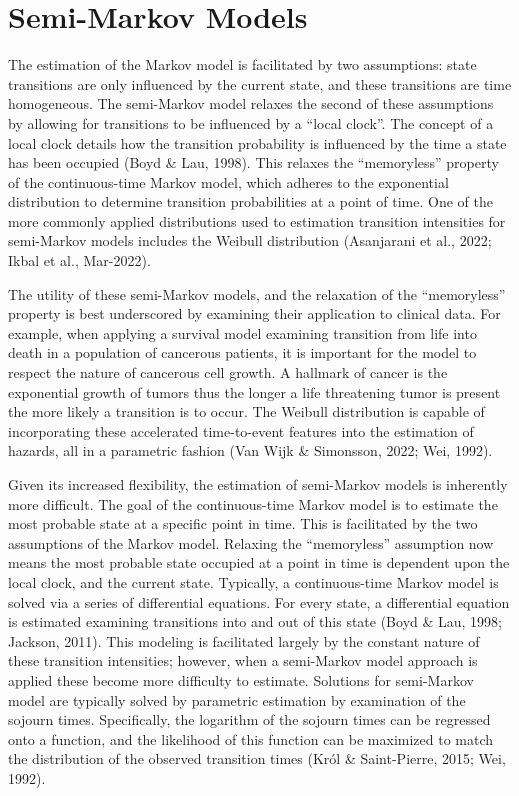 \documentclass[12pt]{./styles/outhesis}
\begin{document}
\section{Semi-Markov Models}
The estimation of the Markov model is facilitated by two assumptions:
state transitions are only influenced by the current state, and these
transitions are time homogeneous. The semi-Markov model relaxes the
second of these assumptions by allowing for transitions to be influenced
by a ``local clock''. The concept of a local clock details how the
transition probability is influenced by the time a state has been
occupied (Boyd \& Lau, 1998). This relaxes the ``memoryless'' property
of the continuous-time Markov model, which adheres to the exponential
distribution to determine transition probabilities at a point of time.
One of the more commonly applied distributions used to estimation
transition intensities for semi-Markov models includes the Weibull
distribution (Asanjarani et al., 2022; Ikbal et al., Mar-2022).

The utility of these semi-Markov models, and the relaxation of the
``memoryless'' property is best underscored by examining their
application to clinical data. For example, when applying a survival
model examining transition from life into death in a population of
cancerous patients, it is important for the model to respect the nature
of cancerous cell growth. A hallmark of cancer is the exponential growth
of tumors thus the longer a life threatening tumor is present the more
likely a transition is to occur. The Weibull distribution is capable of
incorporating these accelerated time-to-event features into the
estimation of hazards, all in a parametric fashion (Van Wijk \&
Simonsson, 2022; Wei, 1992).

Given its increased flexibility, the estimation of semi-Markov models is
inherently more difficult. The goal of the continuous-time Markov model
is to estimate the most probable state at a specific point in time. This
is facilitated by the two assumptions of the Markov model. Relaxing the
``memoryless'' assumption now means the most probable state occupied at
a point in time is dependent upon the local clock, and the current
state. Typically, a continuous-time Markov model is solved via a series
of differential equations. For every state, a differential equation
is estimated examining transitions into and out of this state (Boyd \&
Lau, 1998; Jackson, 2011). This modeling is facilitated largely by the
constant nature of these transition intensities; however, when a
semi-Markov model approach is applied these become more difficulty to
estimate. Solutions for semi-Markov model are typically solved by
parametric estimation by examination of the sojourn times. Specifically,
the logarithm of the sojourn times can be regressed onto a function, and
the likelihood of this function can be maximized to match the
distribution of the observed transition times (Król \& Saint-Pierre,
2015; Wei, 1992).
\end{document}
